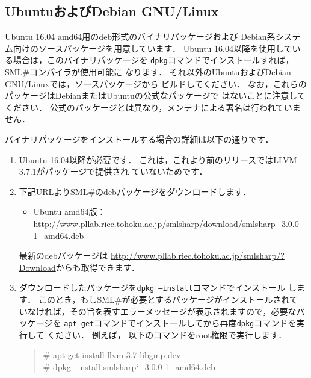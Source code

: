 \documentclass{jbook}
\newif\ifjp
\newcommand{\txt}[2]{#1}
\newcommand{\smlsharp}{SML\#}
\newcommand{\version}{3.0.0}
\newcommand\eurl[1]{{\edef\eurlTMP{{#1}}\expandafter\url\eurlTMP}}
\newenvironment{program}{\begin{quote}\begin{tt}}%
                        {\end{tt}\end{quote}}
\begin{document}
\fi%

\subsection{\txt{UbuntuおよびDebian GNU/Linux}{Ubuntu and Debian GNU/Linux}}
\ifjp%
	Ubuntu 16.04 amd64用のdeb形式のバイナリパッケージおよび
Debian系システム向けのソースパッケージを用意しています．
	Ubuntu 16.04以降を使用している場合は，このバイナリパッケージを
{\tt dpkg}コマンドでインストールすれば，\smlsharp{}コンパイラが使用可能に
なります．
	それ以外のUbuntuおよびDebian GNU/Linuxでは，ソースパッケージから
ビルドしてください．
	なお，これらのパッケージはDebianまたはUbuntuの公式なパッケージで
はないことに注意してください．
	公式のパッケージとは異なり，メンテナによる署名は行われていません．

	バイナリパッケージをインストールする場合の詳細は以下の通りです．
\begin{enumerate}
\item
	Ubuntu 16.04以降が必要です．
	これは，これより前のリリースではLLVM 3.7.1がパッケージで提供され
ていないためです．

\item
	下記URLより\smlsharp{}のdebパッケージをダウンロードします．
\begin{itemize}
\item Ubuntu amd64版：
\eurl{http://www.pllab.riec.tohoku.ac.jp/smlsharp/download/smlsharp_\version-1_amd64.deb}
\end{itemize}
	最新のdebパッケージは
\url{http://www.pllab.riec.tohoku.ac.jp/smlsharp/?Download}からも取得できます．
\item
	ダウンロードしたパッケージを{\tt dpkg --install}コマンドでインストール
します．
	このとき，もし\smlsharp{}が必要とするパッケージがインストールされて
いなければ，その旨を表すエラーメッセージが表示されますので，必要なパッケージを
{\tt apt-get}コマンドでインストールしてから再度{\tt dpkg}コマンドを実行して
ください．
	例えば，%
以下のコマンドをroot権限で実行します．
\begin{program}
\# apt-get install llvm-3.7 libgmp-dev\\
\# dpkg --install smlsharp\char`\_\version{}-1\_amd64.deb
\end{program}
\end{enumerate}
\end{document}
